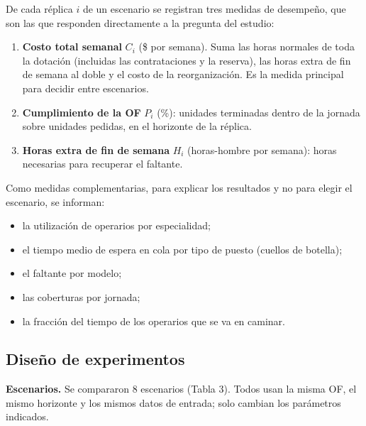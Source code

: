 \documentclass[11pt,a4paper]{article}
\begin{document}
De cada réplica $i$ de un escenario se registran tres medidas de desempeño, que son las que responden directamente a la pregunta del estudio:

\begin{enumerate}
\item \textbf{Costo total semanal} $C_i$ (\$ por semana). Suma las horas normales de toda la dotación (incluidas las contrataciones y la reserva), las horas extra de fin de semana al doble y el costo de la reorganización. Es la medida principal para decidir entre escenarios.
\item \textbf{Cumplimiento de la OF} $P_i$ (\%): unidades terminadas dentro de la jornada sobre unidades pedidas, en el horizonte de la réplica.
\item \textbf{Horas extra de fin de semana} $H_i$ (horas-hombre por semana): horas necesarias para recuperar el faltante.
\end{enumerate}

Como medidas complementarias, para explicar los resultados y no para elegir el escenario, se informan:

\begin{itemize}
\item la utilización de operarios por especialidad;
\item el tiempo medio de espera en cola por tipo de puesto (cuellos de botella);
\item el faltante por modelo;
\item las coberturas por jornada;
\item la fracción del tiempo de los operarios que se va en caminar.
\end{itemize}

\subsection{Diseño de experimentos}

\textbf{Escenarios.} Se compararon 8 escenarios (Tabla 3). Todos usan la misma OF, el mismo horizonte y los mismos datos de entrada; solo cambian los parámetros indicados.
\end{document}

